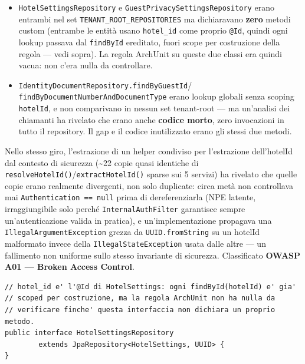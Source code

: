 ﻿\documentclass[a4paper,12pt]{report}
\begin{document}
\begin{itemize}
    \item \texttt{HotelSettingsRepository} e \texttt{GuestPrivacySettingsRepository} erano
    entrambi nel set \texttt{TENANT\_ROOT\_REPOSITORIES} ma dichiaravano \textbf{zero} metodi
    custom (entrambe le entità usano \texttt{hotel\_id} come proprio \texttt{@Id}, quindi ogni
    lookup passava dal \texttt{findById} ereditato, fuori scope per costruzione della regola
    --- vedi sopra). La regola ArchUnit su queste due classi era quindi vacua: non c'era
    nulla da controllare.
    \item \texttt{IdentityDocumentRepository.findByGuestId}/
    \texttt{findByDocumentNumberAndDocumentType} erano lookup globali senza scoping
    \texttt{hotelId}, e non comparivano in nessun set tenant-root --- ma un'analisi dei
    chiamanti ha rivelato che erano anche \textbf{codice morto}, zero invocazioni in tutto il
    repository. Il gap e il codice inutilizzato erano gli stessi due metodi.
\end{itemize}

Nello stesso giro, l'estrazione di un helper condiviso per l'estrazione dell'hotelId dal
contesto di sicurezza (\textasciitilde 22 copie quasi identiche di
\texttt{resolveHotelId()}/\texttt{extractHotelId()} sparse sui 5 servizi) ha rivelato che
quelle copie erano realmente divergenti, non solo duplicate: circa metà non controllava mai
\texttt{Authentication == null} prima di dereferenziarla (NPE latente, irraggiungibile solo
perché \texttt{InternalAuthFilter} garantisce sempre un'autenticazione valida in pratica), e
un'implementazione propagava una \texttt{IllegalArgumentException} grezza da
\texttt{UUID.fromString} su un hotelId malformato invece della \texttt{IllegalStateException}
usata dalle altre --- un fallimento non uniforme sullo stesso invariante di sicurezza.
Classificato \textbf{OWASP A01 --- Broken Access Control}.

\begin{insecurebox}[title={HotelSettingsRepository.java --- regola ArchUnit vacua (baseline)}]
\begin{lstlisting}[style=java]
// hotel_id e' l'@Id di HotelSettings: ogni findById(hotelId) e' gia'
// scoped per costruzione, ma la regola ArchUnit non ha nulla da
// verificare finche' questa interfaccia non dichiara un proprio metodo.
public interface HotelSettingsRepository
        extends JpaRepository<HotelSettings, UUID> {
}
\end{lstlisting}
\end{insecurebox}
\end{document}
